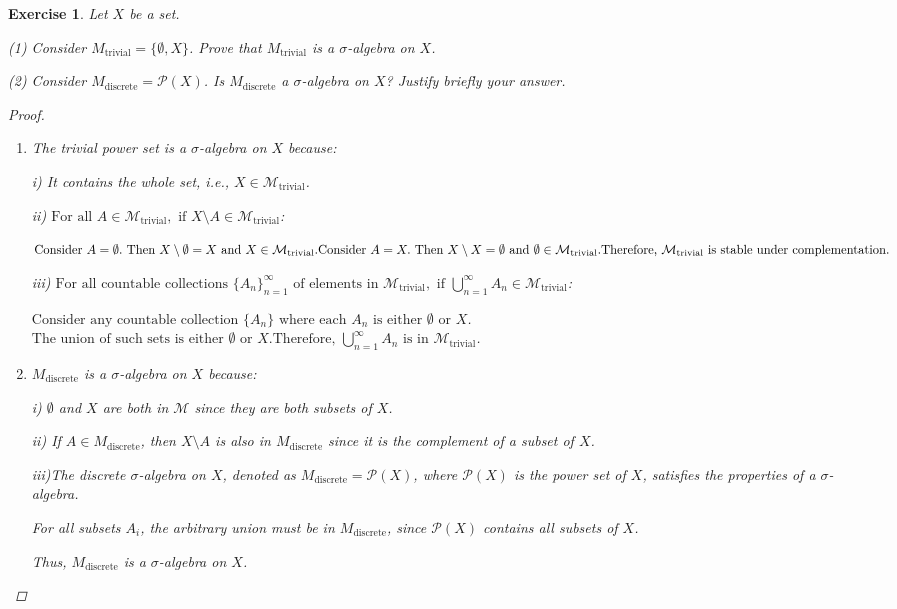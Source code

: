 \documentclass{article}
\newtheorem{exercise}{Exercise}
\begin{document}
    \begin{exercise}
        Let $X$ be a set.

(1) Consider $M_{\text{trivial}} = \{\emptyset, X\}$. Prove that $M_{\text{trivial}}$ is a $\sigma$-algebra on $X$.

(2) Consider $M_{\text{discrete}} = \mathcal{P}(X)$. Is $M_{\text{discrete}}$ a $\sigma$-algebra on $X$? Justify briefly your answer.

    \begin{proof}
    \begin{enumerate}
    
    
    \item  The trivial power set is a $\sigma$-algebra on $X$ because:

i) It contains the whole set, i.e., $X \in \mathcal{M}_{\text{trivial}}$.

ii) $\text{For all } A \in \mathcal{M}_{\text{trivial}}, \text{ if } X \setminus A \in \mathcal{M}_{\text{trivial}}$:

$\text{Consider } A = \emptyset.
\text{ Then } X \setminus \emptyset = X \text{ and } X \in \mathcal{M}_{\text{trivial}}.\\
\text{Consider } A = X.
\text{ Then } X \setminus X = \emptyset \text{ and } \emptyset \in \mathcal{M}_{\text{trivial}}.\\
\text{Therefore, } \mathcal{M}_{\text{trivial}} \text{ is stable under complementation.}$


iii) $\text{For all countable collections } \{ A_n \}_{n=1}^{\infty} \text{ of elements in } \mathcal{M}_{\text{trivial}}, \text{ if } \bigcup_{n=1}^{\infty} A_n \in \mathcal{M}_{\text{trivial}}$:

$\text{Consider any countable collection } \{ A_n \} \text{ where each } A_n \text{ is either } \emptyset \text{ or } X$.\\
$\text{The union of such sets is either } \emptyset \text{ or } X.
\text{Therefore, } \bigcup_{n=1}^{\infty} A_n \text{ is in } \mathcal{M}_{\text{trivial}}$.


    \item  $M_{\text{discrete}}$ is a $\sigma$-algebra on $X$ because:

i) $\emptyset$ and $X$ are both in $\mathcal{M}$ since they are both subsets of $X$.

ii) If $A \in M_{\text{discrete}}$, then $X \setminus A$ is also in  $M_{\text{discrete}}$ since it is the complement of a subset of $X$.

iii)The discrete $\sigma$-algebra on $X$, denoted as \(M_{\text{discrete}} = \mathcal{P}(X)\), where \(\mathcal{P}(X)\) is the power set of \(X\), satisfies the properties of a $\sigma$-algebra.

For all subsets \(A_i\), the arbitrary union must be in \(M_{\text{discrete}}\), since \(\mathcal{P}(X)\) contains all subsets of \(X\).

Thus, \(M_{\text{discrete}}\) is a $\sigma$-algebra on \(X\).


\end{enumerate} 
    \end{proof}
    \end{exercise}
\end{document}
